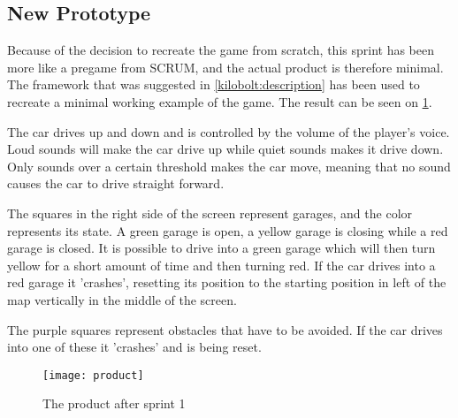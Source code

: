 \subsection{New Prototype}\label{sprint1:product}
Because of the decision to recreate the game from scratch, this sprint has been more like a pregame from SCRUM, and the actual product is therefore minimal.
The framework that was suggested in \cref{kilobolt:description} has been used to recreate a minimal working example of the game.
The result can be seen on \cref{product-sprint1}.

The car drives up and down and is controlled by the volume of the player's voice. 
Loud sounds will make the car drive up while quiet sounds makes it drive down.
Only sounds over a certain threshold makes the car move, meaning that no sound causes the car to drive straight forward.

The squares in the right side of the screen represent garages, and the color represents its state. 
A green garage is open, a yellow garage is closing while a red garage is closed.
It is possible to drive into a green garage which will then turn yellow for a short amount of time and then turning red.
If the car drives into a red garage it 'crashes', resetting its position to the starting position in left of the map vertically in the middle of the screen.

The purple squares represent obstacles that have to be avoided. 
If the car drives into one of these it 'crashes' and is being reset.


\begin{figure}
\texttt{[image: product]}
\caption{The product after sprint 1}
\label{product-sprint1}
\end{figure}